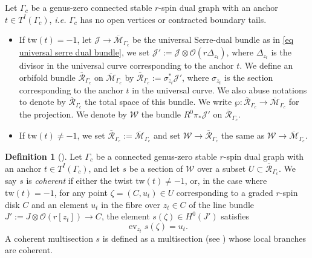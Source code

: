 \documentclass[11pt]{amsart}
\theoremstyle{definition}
\newtheorem{definition}[dummy]{Definition}
\theoremstyle{remark}
\newcommand{\tw}{\text{tw}}
\newcommand{\<}{\left<}
\renewcommand{\>}{\right>}
\numberwithin{equation}{section}
\def\Mbar{{\overline{\mathcal M}}}
\begin{document}
  Let $ \Gamma_c$ be a genus-zero connected stable $r$-spin dual graph with an anchor $t\in T^I(\Gamma_c)$, \textit{i.e.} $ \Gamma_c$  has no open vertices or contracted boundary tails.
  \begin{itemize}
      \item If $\tw(t)=-1$, let $\mathcal J\to \Mbar_{ \Gamma_c}$ be the universal Serre-dual bundle as in \eqref{eq universal serre dual bundle}, we set $\mathcal{J}' := \mathcal{J} \otimes \mathcal O \left( r\Delta_{z_t}\right)$, where $\Delta_{z_t}$ is the divisor in the universal curve corresponding to the anchor $t$.
    We define an orbifold bundle ${\overline{\mathcal{R}}}_{\Gamma_c}$ on $\Mbar_{ \Gamma_c}$ by
    ${\overline{\mathcal{R}}}_{ \Gamma_c}:= \sigma_{z_t}^*\mathcal{J}'$,
     where $\sigma_{z_t}$ is the section corresponding to the  anchor $t$ in the universal curve. We also abuse notations to denote by ${\overline{\mathcal{R}}}_{ \Gamma_c}$ the total space of this bundle. We write
$\wp: {\overline{\mathcal{R}}}_{ \Gamma_c} \to \Mbar_{ \Gamma_c}$ for the projection.     We denote by ${\mathcal{W}}$ the  bundle $R^0\pi_*\mathcal{J}'$ on ${\overline{\mathcal{R}}}_{\Gamma_c}$.
\item If $\tw(t)\ne -1$, we set ${\overline{\mathcal{R}}}_{ \Gamma_c}:=\Mbar_{\Gamma_c}$ and set $\mathcal W\to {\overline{\mathcal{R}}}_{ \Gamma_c}$ the same as $\mathcal W\to \Mbar_{\Gamma_c}$.
  \end{itemize}
  

\begin{definition}[{\cite[Definition 4.2]{BCT2}}]
\label{def coherent}
 Let $ \Gamma_c$ be a connected genus-zero stable $r$-spin dual graph with an anchor $t\in T^I(\Gamma_c)$, and let $s$ be a section of $\mathcal{W}$ over a subset $U\subset{\overline{\mathcal{R}}}_{\Gamma_c}$. We say $s$ is \textit{coherent} if either the twist $\tw(t)\ne -1$, or, in the case where $\tw(t)= -1$, for any point $\zeta=(C, u_t) \in U$  corresponding to a graded $r$-spin disk $C$ and an element $u_t$ in the fibre over $z_t\in C$ of the line bundle $J':=J\otimes \mathcal O(r[z_t])\to C$, the element $s(\zeta) \in H^0(J')$ satisfies
$$\operatorname{ev}_{z_t}s(\zeta) = u_t.$$ A coherent multisection $s$ is defined as a multisection  (see \cite[Appendix A]{BCT2}) whose local branches are coherent. 

\end{definition}
\end{document}
